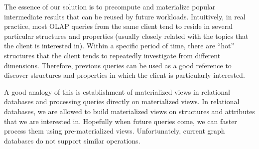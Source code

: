 The essence of our solution is to precompute and materialize popular intermediate results that can be reused by future workloads. Intuitively, in real practice, most OLAP queries from the same client   tend to reside in several particular structures and properties (usually closely related with the topics that the client is interested in). Within a specific period of time, there are ``hot'' structures that the client tends to repeatedly investigate from different dimensions. Therefore, previous queries can be used as a good reference to discover structures and properties in which the client is particularly interested. 


 
 
 
A good analogy of this is establishment of materialized views in relational databases and processing queries directly on materialized views. In relational databases, we are allowed to build materialized views on structures and attributes that we are interested in. Hopefully when future queries come, we can faster process them using pre-materialized views. Unfortunately, current graph databases do not support similar operations. 
 
 
